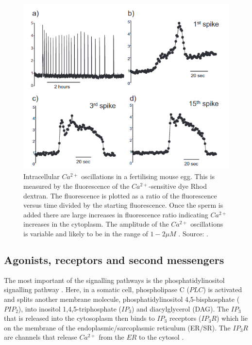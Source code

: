 {\begin{figure}[h!!!t!!!b!!!p]
  \centering
  \includegraphics[width=\linewidth]{Chapters/1_Introduction/extras/karlfig1.png}
  \caption{Intracellular $Ca^{2+}$ oscillations in a fertilising mouse egg. This is measured by the fluorescence of the $Ca^{2+}$-sensitive dye Rhod dextran. The fluorescence is plotted as a ratio of the fluorescence
versus time divided by the starting fluorescence. Once the sperm is added there are large increases in fluorescence ratio
indicating $Ca^{2+}$ increases in the cytoplasm. The amplitude of the $Ca^{2+}$ oscillations is variable and likely to be in the range of $1-2 \mu M$ . {Source:} . }\label{karlfig2}
\end{figure}

\subsection{Agonists, receptors and second messengers}

The most important of the signalling pathways is the phosphatidylinositol signalling pathway \cite{Berridge2000}. Here, {in a somatic cell,} phospholipase C ($PLC$) is activated and splits another membrane molecule, phosphatidylinositol 4,5-bisphosphate ($PIP_2$), into inositol 1,4,5-triphosphate ($IP_3$) and diacylglycerol (DAG). The $IP_3$ that is released into the cytosoplasm  then binds to $IP_3$ receptors ($IP_3R$) which lie on the membrane of the endoplasmic/sarcoplasmic reticulum (ER/SR). The $IP_3R$ are channels that release $Ca^{2+}$ from the $ER$ to the cytosol .

}
